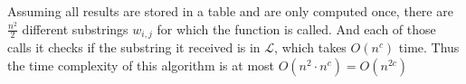 \documentclass{article}
\newcommand{\lang}{\mathcal{L}}
\begin{document}
Assuming all results are stored in a table and are only computed once, there are \(\frac{n^2}{2}\) different substrings \(w_{i,j}\) for which the function is called. And each of those calls it checks if the substring it received is in \(\lang\), which takes \(O(n^c)\) time. Thus the time complexity of this algorithm is at most \(O(n^2 \cdot n^c) = O(n^{2c})\)
\end{document}

